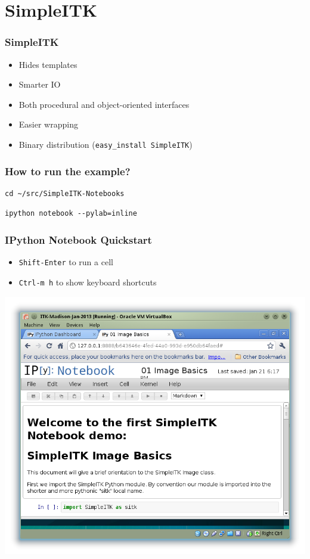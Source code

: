 \section{SimpleITK}



{
\begin{frame}
\frametitle{SimpleITK}
\Huge
\begin{itemize}
\item Hides templates
\pause
\item Smarter IO
\pause
\item Both procedural and object-oriented interfaces
\pause
\item Easier wrapping
\pause
\item Binary distribution (\texttt{easy\_install SimpleITK})
\end{itemize}
\end{frame}
}


\begin{frame}[fragile]
  \frametitle{How to run the example?}
  \fontsize{12pt}{12pt}\selectfont
\begin{verbatim}
cd ~/src/SimpleITK-Notebooks
\end{verbatim}

\begin{verbatim}
ipython notebook --pylab=inline
\end{verbatim}
\end{frame}


\begin{frame}
  \frametitle{IPython Notebook Quickstart}
  \begin{itemize}
    \item \texttt{Shift-Enter} to run a cell
    \item \texttt{Ctrl-m h} to show keyboard shortcuts
  \end{itemize}
  \begin{center}
    \includegraphics[width=0.5\paperwidth]{../Art/IPython-Notebook.png}
  \end{center}
\end{frame}

